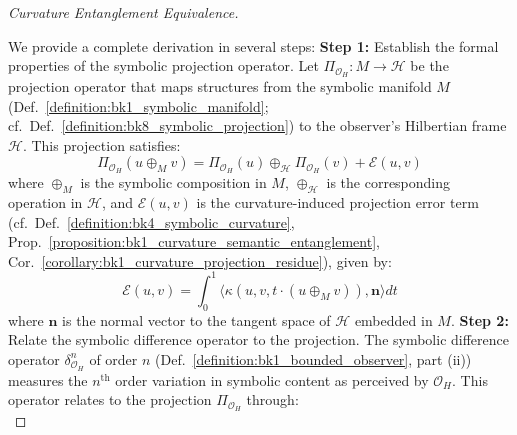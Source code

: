 \begin{proof}[Curvature Entanglement Equivalence]
\label{proof:bk8_curvature_entanglement_equivalence}
\leavevmode

We provide a complete derivation in several steps:
\textbf{Step 1:} Establish the formal properties of the symbolic projection operator.
Let $\Pi_{\mathcal{O}_H}: M \to \mathcal{H}$ be the projection operator that maps structures from the symbolic manifold $M$ (Def.~\ref{definition:bk1_symbolic_manifold}; cf.~Def.~\ref{definition:bk8_symbolic_projection}) to the observer's Hilbertian frame $\mathcal{H}$. This projection satisfies:
\begin{equation}
\Pi_{\mathcal{O}_H}(u \oplus_M v) = \Pi_{\mathcal{O}_H}(u) \oplus_{\mathcal{H}} \Pi_{\mathcal{O}_H}(v) + \mathcal{E}(u,v)
\end{equation}
where $\oplus_M$ is the symbolic composition in $M$, $\oplus_{\mathcal{H}}$ is the corresponding operation in $\mathcal{H}$, and $\mathcal{E}(u,v)$ is the curvature-induced projection error term (cf.~Def.~\ref{definition:bk4_symbolic_curvature}, Prop.~\ref{proposition:bk1_curvature_semantic_entanglement}, Cor.~\ref{corollary:bk1_curvature_projection_residue}), given by:
\begin{equation}
\label{eq:bk8_curvature_projection_error_term}
\mathcal{E}(u,v) = \int_{0}^{1} \langle \kappa(u,v,t\cdot(u \oplus_M v)), \mathbf{n} \rangle dt
\end{equation}
where $\mathbf{n}$ is the normal vector to the tangent space of $\mathcal{H}$ embedded in $M$.
\textbf{Step 2:} Relate the symbolic difference operator to the projection.
The symbolic difference operator $\delta^n_{\mathcal{O}_H}$ of order $n$ (Def.~\ref{definition:bk1_bounded_observer}, part (ii)) measures the $n^{\text{th}}$ order variation in symbolic content as perceived by $\mathcal{O}_H$. This operator relates to the projection $\Pi_{\mathcal{O}_H}$ through:
\begin{equation}

\end{equation}
\end{proof}
